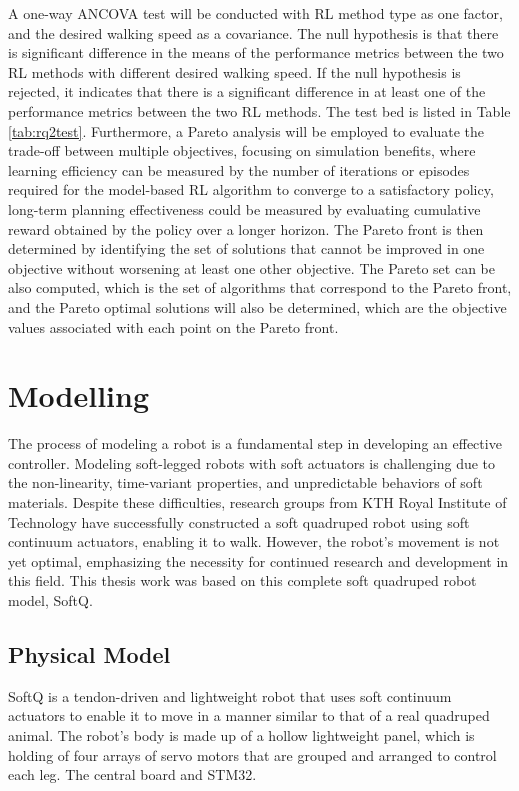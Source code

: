 A one-way ANCOVA test will be conducted with \ac{RL} method type as one factor, and the desired walking speed as a covariance. The null hypothesis is that there is significant difference in the means of the performance metrics between the two RL methods with different desired walking speed. If the null hypothesis is rejected, it indicates that there is a significant difference in at least one of the performance metrics between the two RL methods. The test bed is listed in Table \ref{tab:rq2test}. Furthermore, a Pareto analysis will be employed to evaluate the trade-off between multiple objectives, focusing on simulation benefits, where learning efficiency can be measured by the number of iterations or episodes required for the model-based RL algorithm to converge to a satisfactory policy, long-term planning effectiveness could be measured by evaluating cumulative reward obtained by the policy over a longer horizon. The Pareto front is then determined by identifying the set of solutions that cannot be improved in one objective without worsening at least one other objective. The Pareto set can be also computed, which is the set of algorithms that correspond to the Pareto front, and the Pareto optimal solutions will also be determined, which are the objective values associated with each point on the Pareto front. 


\section{Modelling}
The process of modeling a robot is a fundamental step in developing an effective controller. Modeling soft-legged robots with soft actuators is challenging due to the non-linearity, time-variant properties, and unpredictable behaviors of soft materials. Despite these difficulties, research groups from KTH Royal Institute of Technology\cite{jiSynthesizingOptimalGait2022,daneliaStructureGaitOptimizationof2021,thorapallimuralidharanContinuumActuatorBased2020,jiLearningbasedControl4D2022} have successfully constructed a soft quadruped robot using soft continuum actuators, enabling it to walk. However, the robot's movement is not yet optimal, emphasizing the necessity for continued research and development in this field. This thesis work was based on this complete soft quadruped robot model, SoftQ. 

\subsection{Physical Model}
SoftQ is a tendon-driven and lightweight robot that uses soft continuum actuators to enable it to move in a manner similar to that of a real quadruped animal. The robot's body is made up of a hollow lightweight panel, which is holding of four arrays of servo motors that are grouped and arranged to control each leg. The central board and STM32.

